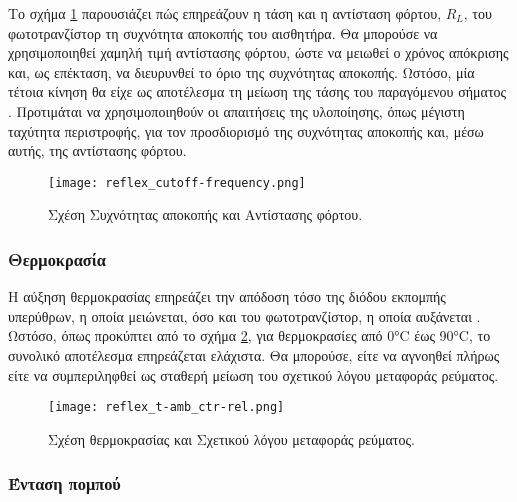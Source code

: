 Το σχήμα \ref{fig:reflex:cutoff-frequency} παρουσιάζει πώς επηρεάζουν η τάση και
η αντίσταση φόρτου, $R_L$, του φωτοτρανζίστορ τη συχνότητα αποκοπής του
αισθητήρα.
Θα μπορούσε να χρησιμοποιηθεί χαμηλή τιμή αντίστασης φόρτου, ώστε να
μειωθεί ο χρόνος απόκρισης και, ως επέκταση, να διευρυνθεί το όριο της
συχνότητας αποκοπής. Ωστόσο, μία τέτοια κίνηση θα είχε ως αποτέλεσμα τη
μείωση της τάσης του παραγόμενου σήματος \parencite{vishay06}.
Προτιμάται να χρησιμοποιηθούν οι απαιτήσεις της υλοποίησης, όπως μέγιστη
ταχύτητα περιστροφής, για τον προσδιορισμό της συχνότητας αποκοπής και, μέσω
αυτής, της αντίστασης φόρτου.

\begin{figure}
    \caption{Σχέση Συχνότητας αποκοπής και Αντίστασης φόρτου.
    \label{fig:reflex:cutoff-frequency}}
    \begin{center}%
    \texttt{[image: reflex\_cutoff-frequency.png]}
    \end{center}

\end{figure}

\subsubsection{Θερμοκρασία}
Η αύξηση θερμοκρασίας επηρεάζει την απόδοση τόσο της διόδου εκπομπής υπερύθρων,
η οποία μειώνεται, όσο και του φωτοτρανζίστορ, η οποία αυξάνεται
\parencite{vishay06}. Ωστόσο, όπως προκύπτει από το σχήμα
\ref{fig:reflex:t-amb_ctr-rel}, για θερμοκρασίες από 0°C έως 90°C, το
συνολικό αποτέλεσμα επηρεάζεται ελάχιστα. Θα μπορούσε, είτε να αγνοηθεί
πλήρως είτε να συμπεριληφθεί ως σταθερή μείωση του σχετικού λόγου μεταφοράς
ρεύματος.

\begin{figure}
    \caption{Σχέση θερμοκρασίας και Σχετικού λόγου μεταφοράς ρεύματος.
    \label{fig:reflex:t-amb_ctr-rel}}
    \begin{center}%
    \texttt{[image: reflex\_t-amb\_ctr-rel.png]}
    \end{center}

\end{figure}

\subsubsection{Ένταση πομπού}

